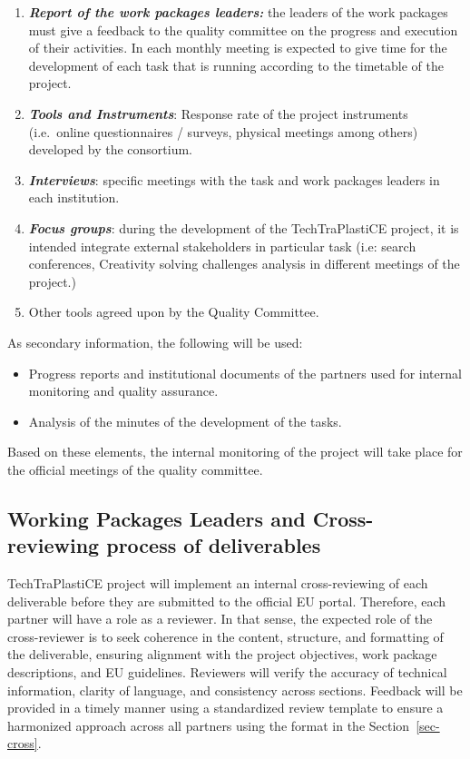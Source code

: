 \documentclass[
  12pt,
  oneside]{book}
\providecommand{\tightlist}{%
  \setlength{\itemsep}{0pt}\setlength{\parskip}{0pt}}\usepackage{longtable,booktabs,array}
\begin{document}
\begin{enumerate}
\def\labelenumi{\arabic{enumi}.}
\tightlist
\item
  \textbf{\emph{Report of the work packages leaders:}} the leaders of
  the work packages must give a feedback to the quality committee on the
  progress and execution of their activities. In each monthly meeting is
  expected to give time for the development of each task that is running
  according to the timetable of the project.
\item
  \textbf{\emph{Tools and Instruments}}: Response rate of the project
  instruments (i.e.~online questionnaires / surveys, physical meetings
  among others) developed by the consortium.
\item
  \textbf{\emph{Interviews}}: specific meetings with the task and work
  packages leaders in each institution.
\item
  \textbf{\emph{Focus groups}}: during the development of the
  TechTraPlastiCE project, it is intended integrate external
  stakeholders in particular task (i.e: search conferences, Creativity
  solving challenges analysis in different meetings of the project.)
\item
  Other tools agreed upon by the Quality Committee.
\end{enumerate}

As secondary information, the following will be used:

\begin{itemize}
\tightlist
\item
  Progress reports and institutional documents of the partners used for
  internal monitoring and quality assurance.
\item
  Analysis of the minutes of the development of the tasks.
\end{itemize}

Based on these elements, the internal monitoring of the project will
take place for the official meetings of the quality committee.

\subsection{Working Packages Leaders and Cross-reviewing process of
deliverables}\label{working-packages-leaders-and-cross-reviewing-process-of-deliverables}

TechTraPlastiCE project will implement an internal cross-reviewing of
each deliverable before they are submitted to the official EU portal.
Therefore, each partner will have a role as a reviewer. In that sense,
the expected role of the cross-reviewer is to seek coherence in the
content, structure, and formatting of the deliverable, ensuring
alignment with the project objectives, work package descriptions, and EU
guidelines. Reviewers will verify the accuracy of technical information,
clarity of language, and consistency across sections. Feedback will be
provided in a timely manner using a standardized review template to
ensure a harmonized approach across all partners using the format in the
Section~\ref{sec-cross}.
\end{document}
